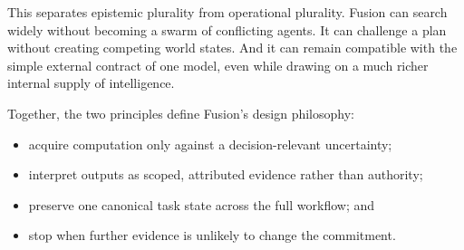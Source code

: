 This separates epistemic plurality from operational plurality. Fusion can
search widely without becoming a swarm of conflicting agents. It can challenge
a plan without creating competing world states. And it can remain compatible
with the simple external contract of one model, even while drawing on a much
richer internal supply of intelligence.

Together, the two principles define Fusion's design philosophy:

\begin{itemize}
  \item acquire computation only against a decision-relevant uncertainty;
  \item interpret outputs as scoped, attributed evidence rather than authority;
  \item preserve one canonical task state across the full workflow; and
  \item stop when further evidence is unlikely to change the commitment.
\end{itemize}
